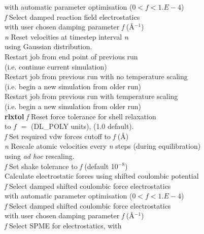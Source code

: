 \begin{tabbing}
\> \> with automatic parameter optimisation ($0<f<1.E-4$) \\
 {\em f}\> Select damped reaction field
electrostatics \\
\> \> with user chosen damping parameter {\em f} (\AA$^{-1}$)\\
 {\em n} \> Reset velocities at timestep interval {\em n}\\
\> \> using Gaussian distribution.\\
 \> Restart job from end point of previous run\\
\> \> (i.e. continue current simulation)\\
 \> Restart job from previous run with no temperature
scaling\\
\> \> (i.e. begin a new simulation from older run)\\
 \> Restart job from previous run with temperature
scaling\\
\> \> (i.e. begin a new simulation from older run)\\
\> {\bf rlxtol} {\em f} \> Reset force tolerance for shell relaxation\\
\> \> to $f$ $=$ (DL\_POLY units), (1.0 default).\\
  {\em f}  \> Set required vdw forces cutoff to {\em f} (\AA)\\
 {\em n} \> Rescale atomic velocities every {\em n} steps
(during equilibration) \\
\> \> using {\em ad hoc} rescaling. \\
 {\em f} \> Set shake tolerance to {\em f}  (default
10$^{-8}$)\\
 \> Calculate  electrostatic forces using 
shifted
coulombic potential\\
 {\em f}\> Select damped shifted coulombic force electrostatics
\\
\> \> with automatic parameter optimisation ($0<f<1.E-4$) \\
 {\em f}\> Select damped shifted coulombic force electrostatics
\\
\> \> with user chosen damping parameter {\em f} (\AA$^{-1}$)\\
 {\em f} \>Select SPME for electrostatics, with  \\

\end{tabbing}
